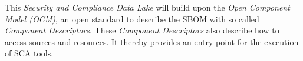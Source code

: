 This \textit{Security and Compliance Data Lake} will build upon the \textit{Open Component Model (OCM)}, an open standard to describe the SBOM with so called\textit{ Component Descriptors}. These \textit{Component Descriptors} also describe how to access sources and resources. It thereby provides an entry point for the execution of SCA tools.

\vfill
\titlespacing*{\chapter}{0pt}{50pt}{40pt}